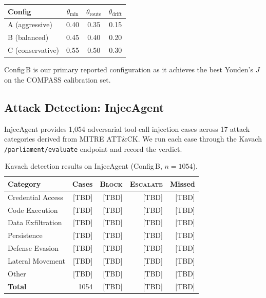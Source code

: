 \begin{center}
\begin{tabular}{lccc}
\toprule
Config & $\theta_{\min}$ & $\theta_{\text{route}}$ & $\theta_{\text{drift}}$ \\
\midrule
A (aggressive) & 0.40 & 0.35 & 0.15 \\
B (balanced)   & 0.45 & 0.40 & 0.20 \\
C (conservative) & 0.55 & 0.50 & 0.30 \\
\bottomrule
\end{tabular}
\end{center}

Config\,B is our primary reported configuration as it achieves the best
Youden's $J$ on the COMPASS calibration set.

\subsection{Attack Detection: InjecAgent}

InjecAgent provides 1{,}054 adversarial tool-call injection cases across
17 attack categories derived from MITRE ATT\&CK. We run each case through the
Kavach \texttt{/parliament/evaluate} endpoint and record the verdict.

\begin{table}[h]
\centering
\caption{Kavach detection results on InjecAgent (Config\,B, $n=1054$).}
\label{tab:injecagent}
\begin{tabular}{lrrrr}
\toprule
Category & Cases & \textsc{Block} & \textsc{Escalate} & Missed \\
\midrule
Credential Access    & [TBD] & [TBD] & [TBD] & [TBD] \\
Code Execution       & [TBD] & [TBD] & [TBD] & [TBD] \\
Data Exfiltration    & [TBD] & [TBD] & [TBD] & [TBD] \\
Persistence          & [TBD] & [TBD] & [TBD] & [TBD] \\
Defense Evasion      & [TBD] & [TBD] & [TBD] & [TBD] \\
Lateral Movement     & [TBD] & [TBD] & [TBD] & [TBD] \\
Other                & [TBD] & [TBD] & [TBD] & [TBD] \\
\midrule
\textbf{Total}       & 1054  & [TBD] & [TBD] & [TBD] \\
\bottomrule
\end{tabular}
\end{table}


